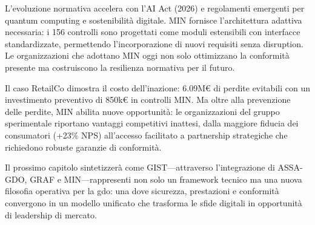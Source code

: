 L'evoluzione normativa accelera con l'AI Act (2026) e regolamenti emergenti per quantum computing e sostenibilità digitale. MIN fornisce l'architettura adattiva necessaria: i 156 controlli sono progettati come moduli estensibili con interfacce standardizzate, permettendo l'incorporazione di nuovi requisiti senza disruption. Le organizzazioni che adottano MIN oggi non solo ottimizzano la conformità presente ma costruiscono la resilienza normativa per il futuro.

Il caso RetailCo dimostra il costo dell'inazione: 6.09M€ di perdite evitabili con un investimento preventivo di 850k€ in controlli MIN. Ma oltre alla prevenzione delle perdite, MIN abilita nuove opportunità: le organizzazioni del gruppo sperimentale riportano vantaggi competitivi inattesi, dalla maggiore fiducia dei consumatori (+23\% NPS) all'accesso facilitato a partnership strategiche che richiedono robuste garanzie di conformità.

Il prossimo capitolo sintetizzerà come GIST—attraverso l'integrazione di ASSA-GDO, GRAF e MIN—rappresenti non solo un framework tecnico ma una nuova filosofia operativa per la \gls{gdo}: una dove sicurezza, prestazioni e conformità convergono in un modello unificato che trasforma le sfide digitali in opportunità di leadership di mercato.

\clearpage
\printbibliography[
    heading=subbibliography,
    title={Riferimenti Bibliografici del Capitolo 4},
]

